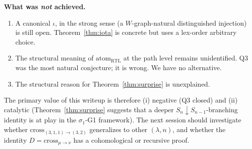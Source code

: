 \documentclass[11pt]{article}
\theoremstyle{definition}
\begin{document}
\textbf{What was \emph{not} achieved.}
\begin{enumerate}[leftmargin=2em,topsep=0.3em,itemsep=0.2em]
\item A canonical $\iota$, in the strong sense (a $W$-graph-natural distinguished injection) is still open. Theorem~\ref{thm:iota} is concrete but uses a lex-order arbitrary choice.
\item The structural meaning of $\mathrm{atom}_{\mathrm{RTL}}$ at the path level remains unidentified. Q3 was the most natural conjecture; it is wrong. We have no alternative.
\item The structural reason for Theorem~\ref{thm:surprise} is unexplained.
\end{enumerate}

The primary value of this writeup is therefore (i) negative (Q3 closed) and (ii) catalytic (Theorem~\ref{thm:surprise} suggests that a deeper $S_n \downarrow S_{n-1}$-branching identity is at play in the $\sigma_1$-G1 framework). The next session should investigate whether $\mathrm{cross}_{(3,1,1)\to(3,2)}$ generalizes to other $(\lambda, n)$, and whether the identity $D = \mathrm{cross}_{\mu\to\nu}$ has a cohomological or recursive proof.
\end{document}
